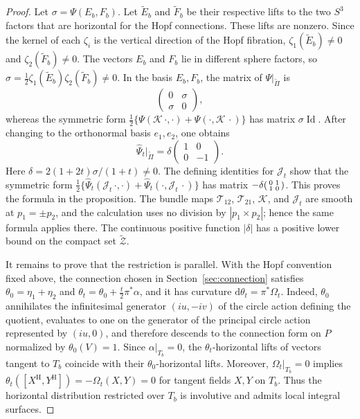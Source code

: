 \documentclass[11pt]{article}
\theoremstyle{definition}
\theoremstyle{remark}
\newcommand{\tZ}{\widetilde{\mathcal Z}}
\newcommand{\Id}{\operatorname{Id}}
\newcommand{\dd}{\mathrm d}
\begin{document}
\begin{proof}
Let $\sigma=\Psi(E_b,F_b)$.
Let $\widetilde E_b$ and $\widetilde F_b$ be their respective lifts to the two
$S^3$ factors that are horizontal for the Hopf connections.  These lifts are
nonzero.  Since the kernel of each $\zeta_i$ is the vertical direction of the
Hopf fibration,
$\zeta_1(\widetilde E_b)\neq0$ and $\zeta_2(\widetilde F_b)\neq0$.  The
vectors $E_b$ and $F_b$ lie in different sphere factors, so
$\sigma=\tfrac12\zeta_1(\widetilde E_b)\zeta_2(\widetilde F_b)\neq0$.
In the basis $E_b,F_b$, the matrix of $\Psi|_{\widetilde\Pi}$ is
\[
 \begin{pmatrix}0&\sigma\\ \sigma&0\end{pmatrix},
\]
whereas the symmetric form
$\tfrac12\{\Psi(\mathscr K\,\cdot,\cdot)+\Psi(\cdot,\mathscr K\,\cdot)\}$
has matrix $\sigma\Id$.  After changing to the orthonormal
basis $e_1,e_2$, one obtains
\[
 \widehat\Psi_t|_{\widetilde\Pi}=\delta\begin{pmatrix}1&0\\0&-1\end{pmatrix}.
\]
Here $\delta=2(1+2t)\sigma/(1+t)\neq0$.
The defining identities for $\mathscr J_t$ show that the symmetric form
$\tfrac12\{\widehat\Psi_t(\mathscr J_t\,\cdot,\cdot)
+\widehat\Psi_t(\cdot,\mathscr J_t\,\cdot)\}$ has matrix
$-\delta\begin{psmallmatrix}0&1\\1&0\end{psmallmatrix}$.
This proves the formula in the proposition.  The bundle maps $\mathcal T_{12}$,
$\mathcal T_{21}$, $\mathscr K$, and $\mathscr J_t$ are smooth at
$p_1=\pm p_2$, and the calculation uses no division by
$|p_1\times p_2|$; hence the same formula applies there.  The
continuous positive function $|\delta|$ has a positive lower bound on the
compact set $\tZ$.

It remains to prove that the restriction is parallel.  With the Hopf
convention fixed above, the
connection chosen in Section~\ref{sec:connection} satisfies
$\theta_0=\eta_1+\eta_2$ and
$\theta_t=\theta_0+\tfrac t2\pi^*\alpha$, and it has curvature
$\dd\theta_t=\pi^*\Omega_t$.  Indeed, $\theta_0$ annihilates the infinitesimal
generator $(iu,-iv)$ of the circle action defining the quotient, evaluates to
one on the generator of the principal circle action represented by $(iu,0)$,
and therefore descends to the connection form on $P$ normalized by
$\theta_0(V)=1$.  Since $\alpha|_{T_b}=0$, the
$\theta_t$-horizontal lifts of vectors tangent to $T_b$ coincide with
their $\theta_0$-horizontal lifts.  Moreover,
$\Omega_t|_{T_b}=0$ implies
$\theta_t([X^{\mathrm H},Y^{\mathrm H}])=-\Omega_t(X,Y)=0$ for tangent fields $X,Y$ on
$T_b$.  Thus the horizontal distribution restricted over $T_b$ is involutive
and admits local integral surfaces.


\end{proof}
\end{document}
